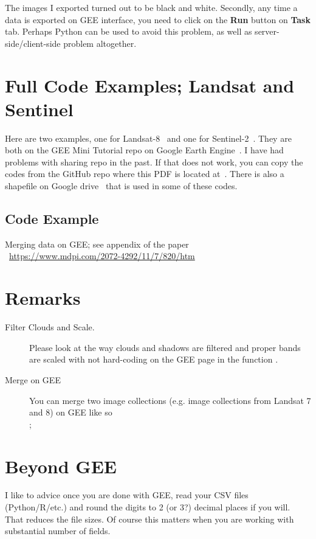\begin{description}
The images I exported turned out to be black and white.
Secondly, any time a data is exported on GEE interface, you need
to click on the \textbf{Run} button on \textbf{Task} tab. Perhaps Python
can be used to avoid this problem, as well as server-side/client-side
problem altogether.
\end{description}

\section{Full Code Examples; Landsat and Sentinel}

Here are two examples, one for Landsat-8~\citep{FullCodeLandsat8} 
and one for Sentinel-2~\citep{FullCodeSentinel}.
They are both on the GEE Mini Tutorial repo on 
Google Earth Engine~\citep{GEEMiniTutorialRepoonEE}. 
I have had problems with sharing repo in the past.
If that does not work, you can copy the codes
from the GitHub repo where this PDF is located
at~\citep{MiniTutorialOnGitHub}.
There is also a shapefile on Google drive~\citep{ShapeFileOnDrive} that is used
in some of these codes.

\subsection{Code Example}
Merging data on GEE; see appendix of the paper\\
~\href{https://www.mdpi.com/2072-4292/11/7/820/htm}{https://www.mdpi.com/2072-4292/11/7/820/htm}

\section{Remarks}

\begin{description}
\item [Filter Clouds and Scale.]
Please look at the way clouds and shadows are
filtered and proper bands are scaled with not hard-coding
on the GEE page\cite{MaskCloudShadowScaleprepSrL8}
in the function .

\item [Merge on GEE] You can merge
two image collections (e.g. image collections from Landsat 7 and 8)
on GEE like so \\
;

\end{description}

\section{Beyond GEE}
I like to advice once you are done with GEE,
read your CSV files (Python/R/etc.) and round the 
digits to 2 (or 3?) decimal places
if you will. That reduces the file sizes.
Of course this matters when you are working
with substantial number of fields.

